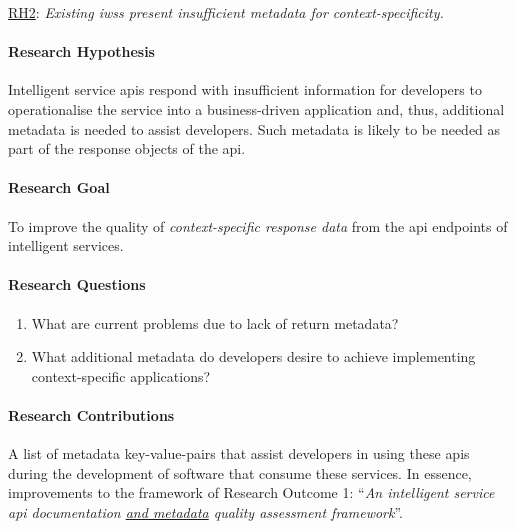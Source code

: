 \begin{titled-frame}{\underline{RH2}: \textit{Existing \glspl{iws} present insufficient metadata for context-specificity.} }
\label{rh2}
\vspace{-12pt}
\paragraph{Research Hypothesis}
Intelligent service \glspl{api} respond with insufficient information for developers to operationalise the service into a business-driven application and, thus, additional metadata is needed to assist developers. Such metadata is likely to be needed as part of the response objects of the \gls{api}.

\paragraph{Research Goal}
To improve the quality of \textit{context-specific response data} from the \gls{api} endpoints of intelligent services.

\paragraph{Research Questions}
\begin{enumerate}[label=\textbf{RQ2.\arabic*.}, ref=RQ2.\arabic*, leftmargin=3.5\parindent, rightmargin=1\parindent]
  \item What are current problems due to lack of return metadata?
  \label{rqs:metadata:what-problems-du                                                                e-to-lack-of-metadata}
  
  
  \item What additional metadata do developers desire to achieve implementing context-specific applications?
  \label{rqs:metadata:what-metadata-do-devs-want-and-why}
\end{enumerate}

\paragraph{Research Contributions} A list of metadata key-value-pairs that assist developers in using these \glspl{api} during the development of software that consume these services. In essence, improvements to the framework of Research Outcome 1: ``\textit{An intelligent service \gls{api} documentation \underline{\upshape and metadata} quality assessment framework}''.

\end{titled-frame}

